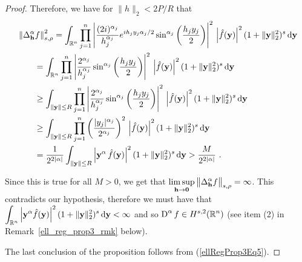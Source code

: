 \begin{proof}
Therefore, we have for $\displaystyle \|h\|_2 < 2P/R$ that
\begin{align*}
&\left\| \Delta^\alpha_{\mathbf{h}} f \right\|_{s,\rho}^2
= \int_{\mathbb{R}^n} \prod_{j=1}^n \left| \frac{(2i)^{\alpha_j}}{h_j^{\alpha_j}}
e^{i h_j y_j \alpha_j/2} \sin^{\alpha_j}\left(\frac{h_j y_j}{2}\right) \right|^2
\,\left| \hat{f}(\mathbf{y})\right|^2 (1+\|\mathbf{y}\|_2^2)^s \,\mathrm{d}{\mathbf{y}} \\
&\qquad = \int_{\mathbb{R}^n}
\prod_{j=1}^n \left| \frac{2^{\alpha_j}}{h_j^{\alpha_j}}
\sin^{\alpha_j}\left(\frac{h_j y_j}{2}\right) \right|^2
\,\left| \hat{f}(\mathbf{y})\right|^2 (1+\|\mathbf{y}\|_2^2)^s \,\mathrm{d}{\mathbf{y}} \\
&\qquad \geq \int_{\|\mathbf{y}\|\leq R} 
\prod_{j=1}^n \left| \frac{2^{\alpha_j}}{h_j^{\alpha_j}}
\sin^{\alpha_j}\left(\frac{h_j y_j}{2}\right) \right|^2
\,\left| \hat{f}(\mathbf{y})\right|^2 (1+\|\mathbf{y}\|_2^2)^s \,\mathrm{d}{\mathbf{y}} \\
&\qquad \geq \int_{\|\mathbf{y}\|\leq R}
\prod_{j=1}^n \left( \frac{|y_j|^{\alpha_j}}{2^{\alpha_j}} \right)^2
\,\left| \hat{f}(\mathbf{y})\right|^2 (1+\|\mathbf{y}\|_2^2)^s \,\mathrm{d}{\mathbf{y}} \\
&\qquad = \frac{1}{2^{2|\alpha|}} \int_{\|\mathbf{y}\|\leq R}
\left| \mathbf{y}^\alpha \, \hat{f}(\mathbf{y}) \right|^2
(1+\|\mathbf{y}\|_2^2)^s \,\mathrm{d}{\mathbf{y}}
> \frac{M}{2^{2|\alpha|}} \ .
\end{align*}

Since this is true for all $M>0$, we get that
$\displaystyle \limsup_{\mathbf{h}\rightarrow \mathbf{0}}
\big\|\Delta^\alpha_{\mathbf{h}} f\big\|_{s,\rho} = \infty$.
This contradicts our hypothesis, therefore we must have that
$\displaystyle
\int_{\mathbb{R}^n} \left| \mathbf{y}^\alpha \hat{f}(\mathbf{y})\right|^2
(1 + \|\mathbf{y}\|_2^2)^s \,\mathrm{d}{\mathbf{y}} < \infty$
and so $\displaystyle \operatorname{D}^\alpha f \in H^{s,2}(\mathbb{R}^n)$ (see
item (2) in Remark~\ref{ell_reg_prop3_rmk} below).

  The last conclusion of the proposition follows
from (\ref{ellRegProp3Eq5}).
\end{proof}


